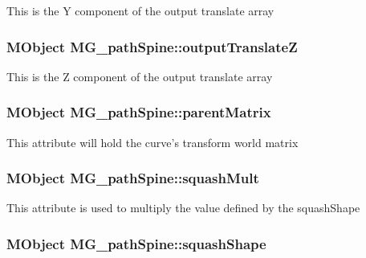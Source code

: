 This is the Y component of the output translate array \hypertarget{class_m_g__path_spine_ac19e9b5e38b171a158692ce31204dc1b}{
\subsubsection[{output\-Translate\-Z}]{\setlength{\rightskip}{0pt plus 5cm}M\-Object M\-G\-\_\-path\-Spine\-::output\-Translate\-Z\hspace{0.3cm}{\ttfamily [static]}}}\label{class_m_g__path_spine_ac19e9b5e38b171a158692ce31204dc1b}
This is the Z component of the output translate array \hypertarget{class_m_g__path_spine_a8eddab32708caeddc2c871d39e5d92fd}{
\subsubsection[{parent\-Matrix}]{\setlength{\rightskip}{0pt plus 5cm}M\-Object M\-G\-\_\-path\-Spine\-::parent\-Matrix\hspace{0.3cm}{\ttfamily [static]}}}\label{class_m_g__path_spine_a8eddab32708caeddc2c871d39e5d92fd}
This attribute will hold the curve's transform world matrix \hypertarget{class_m_g__path_spine_a9af9d259a81115c7fef275c67d54ccb1}{
\subsubsection[{squash\-Mult}]{\setlength{\rightskip}{0pt plus 5cm}M\-Object M\-G\-\_\-path\-Spine\-::squash\-Mult\hspace{0.3cm}{\ttfamily [static]}}}\label{class_m_g__path_spine_a9af9d259a81115c7fef275c67d54ccb1}
This attribute is used to multiply the value defined by the squash\-Shape \hypertarget{class_m_g__path_spine_ab28430d046de80302091ba8be2c1ba8f}{
\subsubsection[{squash\-Shape}]{\setlength{\rightskip}{0pt plus 5cm}M\-Object M\-G\-\_\-path\-Spine\-::squash\-Shape\hspace{0.3cm}{\ttfamily [static]}}}\label{class_m_g__path_spine_ab28430d046de80302091ba8be2c1ba8f}
